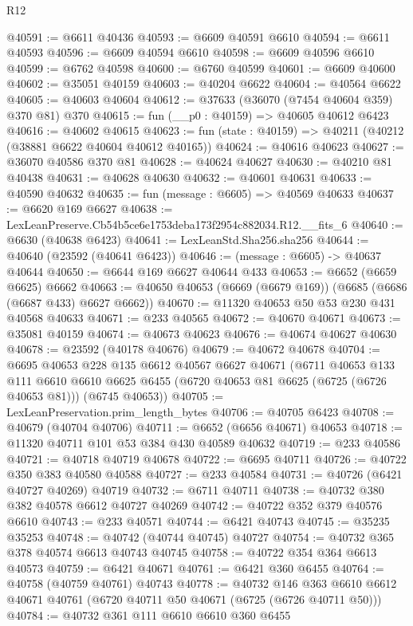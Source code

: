 \begin{lexlean}{R12}
\begin{coremodule}
@40591 := @6611 @40436
@40593 := @6609 @40591 @6610
@40594 := @6611 @40593
@40596 := @6609 @40594 @6610
@40598 := @6609 @40596 @6610
@40599 := @6762 @40598
@40600 := @6760 @40599
@40601 := @6609 @40600
@40602 := @35051 @40159
@40603 := @40204 @6622
@40604 := @40564 @6622
@40605 := @40603 @40604
@40612 := @37633 (@36070 (@7454 @40604 @359) @370 @81) @370
@40615 := fun (__p0 : @40159) => @40605 @40612 @6423
@40616 := @40602 @40615
@40623 := fun (state : @40159) => @40211 (@40212 (@38881 @6622 @40604 @40612 @40165))
@40624 := @40616 @40623
@40627 := @36070 @40586 @370 @81
@40628 := @40624 @40627
@40630 := @40210 @81 @40438
@40631 := @40628 @40630
@40632 := @40601 @40631
@40633 := @40590 @40632
@40635 := fun (message : @6605) => @40569 @40633
@40637 := @6620 @169 @6627
@40638 := LexLeanPreserve.Cb54b5ce6e1753deba173f2954c882034.R12.__fits_6
@40640 := @6630 (@40638 @6423)
@40641 := LexLeanStd.Sha256.sha256
@40644 := @40640 (@23592 (@40641 @6423))
@40646 := (message : @6605) -> @40637 @40644
@40650 := @6644 @169 @6627 @40644 @433
@40653 := @6652 (@6659 @6625) @6662
@40663 := @40650 @40653 (@6669 (@6679 @169)) (@6685 (@6686 (@6687 @433) @6627 @6662))
@40670 := @11320 @40653 @50 @53 @230 @431 @40568 @40633
@40671 := @233 @40565
@40672 := @40670 @40671
@40673 := @35081 @40159
@40674 := @40673 @40623
@40676 := @40674 @40627 @40630
@40678 := @23592 (@40178 @40676)
@40679 := @40672 @40678
@40704 := @6695
    @40653
    @228
    @135
    @6612
    @40567
    @6627
    @40671
    (@6711
      @40653
      @133
      @111
      @6610
      @6610
      @6625
      @6455
      (@6720 @40653 @81 @6625 (@6725 (@6726 @40653 @81)))
      (@6745 @40653))
@40705 := LexLeanPreservation.prim_length_bytes
@40706 := @40705 @6423
@40708 := @40679 (@40704 @40706)
@40711 := @6652 (@6656 @40671) @40653
@40718 := @11320 @40711 @101 @53 @384 @430 @40589 @40632
@40719 := @233 @40586
@40721 := @40718 @40719 @40678
@40722 := @6695 @40711
@40726 := @40722 @350 @383 @40580 @40588
@40727 := @233 @40584
@40731 := @40726 (@6421 @40727 @40269) @40719
@40732 := @6711 @40711
@40738 := @40732 @380 @382 @40578 @6612 @40727 @40269
@40742 := @40722 @352 @379 @40576 @6610
@40743 := @233 @40571
@40744 := @6421 @40743
@40745 := @35235 @35253
@40748 := @40742 (@40744 @40745) @40727
@40754 := @40732 @365 @378 @40574 @6613 @40743 @40745
@40758 := @40722 @354 @364 @6613 @40573
@40759 := @6421 @40671
@40761 := @6421 @360 @6455
@40764 := @40758 (@40759 @40761) @40743
@40778 := @40732
    @146
    @363
    @6610
    @6612
    @40671
    @40761
    (@6720 @40711 @50 @40671 (@6725 (@6726 @40711 @50)))
@40784 := @40732 @361 @111 @6610 @6610 @360 @6455

\end{coremodule}
\end{lexlean}
